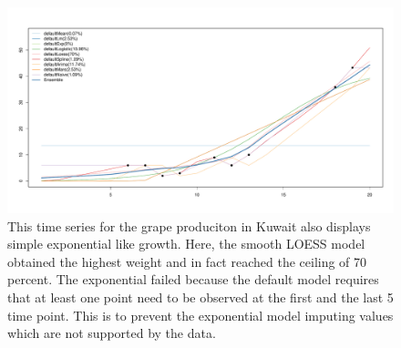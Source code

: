 \documentclass[nojss]{jss}\usepackage[]{graphicx}\usepackage[]{color}
\makeatletter
\def\maxwidth{ %
  \ifdim\Gin@nat@width>\linewidth
    \linewidth
  \else
    \Gin@nat@width
  \fi
}
\newenvironment{knitrout}{}{} %
\makeatother
\begin{document}
\begin{knitrout}
\color{fgcolor}\begin{figure}[!ht]


{\centering \includegraphics[width=\maxwidth]{figure/grape-kuwait} 

}

\caption[This time series for the grape produciton in Kuwait also displays simple exponential like growth]{This time series for the grape produciton in Kuwait also displays simple exponential like growth. Here, the smooth LOESS model obtained the highest weight and in fact reached the ceiling of 70 percent. The exponential failed because the default model requires that at least one point need to be observed at the first and the last 5 time point. This is to prevent the exponential model imputing values which are not supported by the data.\label{fig:grape-kuwait}}
\end{figure}


\end{knitrout}
\end{document}
